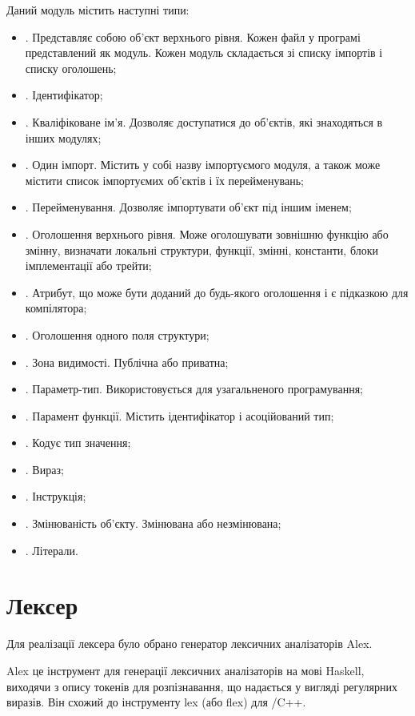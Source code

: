 \documentclass[main.tex]{subfiles}
\begin{document}
Даний модуль містить наступні типи:
\begin{itemize}
\item {}. Представляє собою об'єкт верхнього рівня. Кожен файл у програмі представлений як модуль. Кожен модуль складається зі списку імпортів і списку оголошень;
\item {}. Ідентифікатор;
\item {}. Кваліфіковане ім'я. Дозволяє доступатися до об'єктів, які знаходяться в інших модулях;
\item {}. Один імпорт. Містить у собі назву імпортуємого модуля, а також може містити список імпортуємих об'єктів і їх перейменувань;
\item {}. Перейменування. Дозволяє імпортувати об'єкт під іншим іменем;
\item {}. Оголошення верхнього рівня. Може оголошувати зовнішню функцію або змінну, визначати локальні структури, функції, змінні, константи, блоки імплементації або трейти;
\item {}. Атрибут, що може бути доданий до будь-якого оголошення і є підказкою для компілятора;
\item {}. Оголошення одного поля структури;
\item {}. Зона видимості. Публічна або приватна;
\item {}. Параметр-тип. Використовується для узагальненого програмування;
\item {}. Парамент функції. Містить ідентифікатор і асоційований тип;
\item {}. Кодує тип значення;
\item {}. Вираз;
\item {}. Інструкція;
\item {}. Змінюваність об'єкту. Змінювана або незмінювана;
\item {}. Літерали.
\end{itemize}

\section{Лексер}
Для реалізації лексера було обрано генератор лексичних аналізаторів Alex\cite{alex}.

Alex це інструмент для генерації лексичних аналізаторів на мові Haskell, виходячи з опису токенів для розпізнавання, що надається у вигляді регулярних виразів. Він схожий до інструменту lex (або flex) для \LangC{}/C++.
\end{document}
